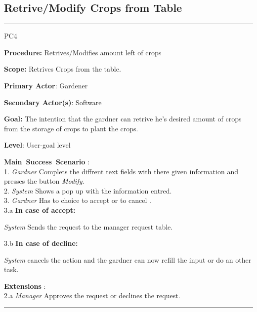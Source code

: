 \subsection{Retrive/Modify Crops from Table}

\vspace{0.5cm}
\hrule
\hfill \break
\begin{lyxlist}{PC4}
\small{
\item [\textbf{Procedure:}] Retrives/Modifies amount left of crops
\item [\textbf{Scope:}] Retrives Crops from the table.
\item [\textbf{Primary Actor}:] Gardener
\item [\textbf{Secondary Actor(s)}:] Software
\item [\textbf{Goal:}] The intention that the gardner can retrive he's desired
amount of crops from the storage of crops to plant the crops.
\item [\textbf{Level}:] User-goal level
\item [\textbf{Main~Success~Scenario}]:\\
1. \emph{Gardner} Complets the diffrent text fields with there given
information and presses the button \emph{Modify}. \\
2. \emph{System} Shows a pop up with the information entred.\\
3. \emph{Gardner} Has to choice to accept or to cancel .\\
	3.a \textbf{In case of accept:}
		\begin{Tab}{2em} \emph{System} Sends the request to the manager
		request table.\end{Tab}
	3.b \textbf{In case of decline:}
		\begin{Tab}{2em} \emph{System} cancels the action and the gardner can
		now refill the input or do an other task. \end{Tab}
\item [\textbf{Extensions}]:\\
2.a  \emph{Manager} Approves the request or declines the request.\\
}
\end{lyxlist}
\hrule
\vspace{0.5cm}

\break






